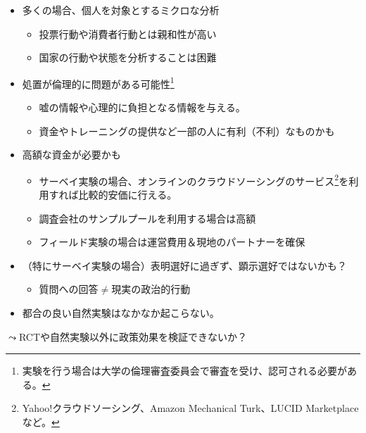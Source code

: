 \documentclass[
  xelatex,
  ja=standard]{bxjsarticle}
\providecommand{\tightlist}{%
  \setlength{\itemsep}{0pt}\setlength{\parskip}{0pt}}\usepackage{longtable,booktabs,array}
\begin{document}
\begin{itemize}
\tightlist
\item
  多くの場合、個人を対象とするミクロな分析

  \begin{itemize}
  \tightlist
  \item
    投票行動や消費者行動とは親和性が高い
  \item
    国家の行動や状態を分析することは困難
  \end{itemize}
\item
  処置が倫理的に問題がある可能性\footnote{実験を行う場合は大学の倫理審査委員会で審査を受け、認可される必要がある。}

  \begin{itemize}
  \tightlist
  \item
    嘘の情報や心理的に負担となる情報を与える。
  \item
    資金やトレーニングの提供など一部の人に有利（不利）なものかも
  \end{itemize}
\item
  高額な資金が必要かも

  \begin{itemize}
  \tightlist
  \item
    サーベイ実験の場合、オンラインのクラウドソーシングのサービス\footnote{Yahoo!クラウドソーシング、Amazon
      Mechanical Turk、LUCID Marketplaceなど。}を利用すれば比較的安価に行える。
  \item
    調査会社のサンプルプールを利用する場合は高額
  \item
    フィールド実験の場合は運営費用＆現地のパートナーを確保
  \end{itemize}
\item
  （特にサーベイ実験の場合）表明選好に過ぎず、顕示選好ではないかも？

  \begin{itemize}
  \tightlist
  \item
    質問への回答\(\neq\)現実の政治的行動
  \end{itemize}
\item
  都合の良い自然実験はなかなか起こらない。
\end{itemize}

\(\leadsto\)RCTや自然実験以外に政策効果を検証できないか？


  
\end{document}
